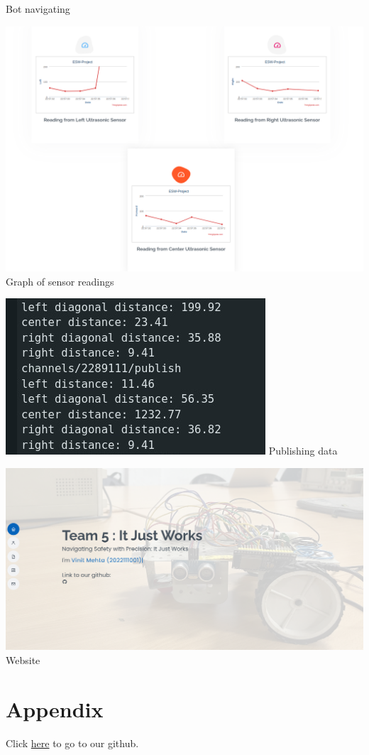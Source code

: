 \documentclass{article}
\begin{document}
\begin{center}
\begin{minipage}{0.3\textwidth}
    Bot navigating
    \vspace{0.5cm}
\end{minipage}
\hfill
\begin{minipage}{0.4\textwidth}
    \centering
    \includegraphics[width=\linewidth]{website-graph.png}
    Graph of sensor readings
\end{minipage}
\hfill
\begin{minipage}{0.5\textwidth}
    \centering
    \includegraphics[width=\linewidth]{data-publish.jpeg}
    Publishing data
    \vspace{0.5cm}
\end{minipage}
\hfill
\begin{minipage}{1.0\textwidth}
    \centering
    \includegraphics[width=\linewidth]{website-front.png}
    Website
\end{minipage}

\end{center}

\section{Appendix}
Click \href{https://github.com/Vinit2244/ESW-Project-It-Just-Works}{here} to go to our github.
\end{document}
